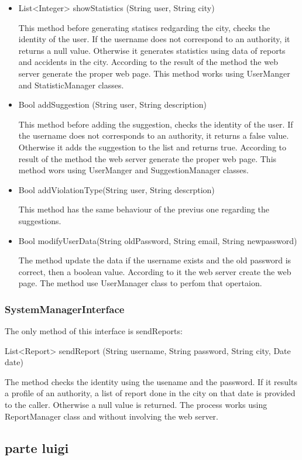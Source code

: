 \begin{itemize}
	 \item
	List<Integer> showStatistics (String user, String city)
	
	This method before generating statiscs redgarding the city, checks the identity of the user. 
	If the username does not correspond to an authority, it returns a null value.
	Otherwise it generates statistics using data of reports and accidents in the city.
	According to the result of the method the web server generate the proper web page.
	This method works using UserManger and StatisticManager classes.
	
	\item 
	Bool addSuggestion (String user, String description)
	
	This method before adding the suggestion, checks the identity of the user. 
	If the username does not corresponds to an authority, it returns a false value.
	Otherwise it adds the suggestion to the list and returns true.
	According to result of the method the web server generate the proper web page.
	This method wors using UserManger and SuggestionManager classes.
	
	\item 
	Bool addViolationType(String user, String descrption)
	
	This method has the same behaviour of the previus one regarding the suggestions.
	
	\item 
	Bool modifyUserData(String oldPassword, String email, String newpassword)
	
	The method update the data if the username exists and the old password is correct, then
	a boolean value. According to it the web server create the web page.
	The method use UserManager class to perfom that opertaion.
\end{itemize}

\subsubsection{SystemManagerInterface}

The only method of this interface is sendReports:
\hfill

List<Report> sendReport (String username, String password, String city, Date date)



The method checks the identity using the usename and the password. If it results a profile of an authority, a list of report done in the city on that date is provided to the caller. Otherwise a null value is returned.
The process works using ReportManager class and without involving the web server.

\subsection{parte luigi}






